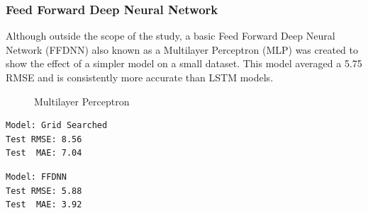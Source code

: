\documentclass[10pt,11pt,12pt,oneside]{book}
\begin{document}
\subsubsection{Feed Forward Deep Neural Network}
Although outside the scope of the study, a basic Feed Forward Deep Neural Network (FFDNN) also known as a Multilayer Perceptron (MLP) was created to show the effect of a simpler model on a small dataset. This model averaged a 5.75 RMSE and is consistently more accurate than LSTM models. \\
\begin{figure}[H]
    \centering
    \qquad
    \caption{Multilayer Perceptron}%
    \label{fig:mlp}%
\end{figure}
\begin{multicols}{2}
\centering
\begin{verbatim}
Model: Grid Searched
Test RMSE: 8.56
Test  MAE: 7.04
\end{verbatim}
\begin{verbatim}
Model: FFDNN
Test RMSE: 5.88
Test  MAE: 3.92
\end{verbatim}
\end{multicols}
\end{document}

